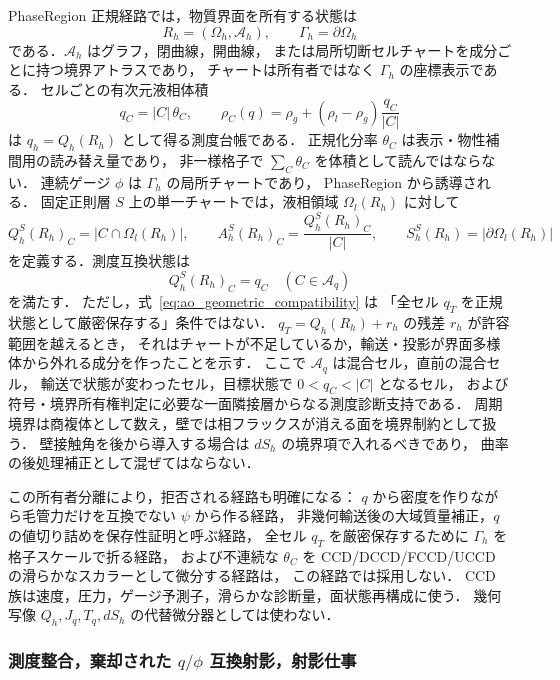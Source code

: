 PhaseRegion 正規経路では，物質界面を所有する状態は
\[
  R_h=(\Omega_h,\mathcal{A}_h),
  \qquad
  \Gamma_h=\partial\Omega_h
\]
である．$\mathcal{A}_h$ はグラフ，閉曲線，開曲線，
または局所切断セルチャートを成分ごとに持つ境界アトラスであり，
チャートは所有者ではなく $\Gamma_h$ の座標表示である．
セルごとの有次元液相体積
\begin{equation}
  q_C = |C|\,\theta_C,\qquad
  \rho_C(q)=\rho_g+(\rho_l-\rho_g)\frac{q_C}{|C|}
  \label{eq:ao_volume_owner}
\end{equation}
は $q_h=Q_h(R_h)$ として得る測度台帳である．
正規化分率 $\theta_C$ は表示・物性補間用の読み替え量であり，
非一様格子で $\sum_C\theta_C$ を体積として読んではならない．
連続ゲージ $\phi$ は $\Gamma_h$ の局所チャートであり，
PhaseRegion から誘導される．
固定正則層 $S$ 上の単一チャートでは，液相領域
$\Omega_l(R_h)$ に対して
\begin{equation}
  Q_h^S(R_h)_C
  =
  |C\cap\Omega_l(R_h)|,
  \qquad
  A_h^S(R_h)_C=\frac{Q_h^S(R_h)_C}{|C|},
  \qquad
  S_h^S(R_h)=|\partial\Omega_l(R_h)|
  \label{eq:ao_geometry_maps}
\end{equation}
を定義する．測度互換状態は
\begin{equation}
  Q_h^S(R_h)_C=q_C
  \quad (C\in\mathcal{A}_q)
  \label{eq:ao_geometric_compatibility}
\end{equation}
を満たす．
ただし，式~\eqref{eq:ao_geometric_compatibility} は
「全セル $q_T$ を正規状態として厳密保存する」条件ではない．
$q_T=Q_h(R_h)+r_h$ の残差 $r_h$ が許容範囲を越えるとき，
それはチャートが不足しているか，輸送・投影が界面多様体から外れる成分を作ったことを示す．
ここで $\mathcal{A}_q$ は混合セル，直前の混合セル，
輸送で状態が変わったセル，目標状態で $0<q_C<|C|$ となるセル，
および符号・境界所有権判定に必要な一面隣接層からなる測度診断支持である．
周期境界は商複体として数え，壁では相フラックスが消える面を境界制約として扱う．
壁接触角を後から導入する場合は $dS_h$ の境界項で入れるべきであり，
曲率の後処理補正として混ぜてはならない．

この所有者分離により，拒否される経路も明確になる：
$q$ から密度を作りながら毛管力だけを互換でない $\psi$ から作る経路，
非幾何輸送後の大域質量補正，$q$ の値切り詰めを保存性証明と呼ぶ経路，
全セル $q_T$ を厳密保存するために $\Gamma_h$ を格子スケールで折る経路，
および不連続な $\theta_C$ を CCD/DCCD/FCCD/UCCD の滑らかなスカラーとして微分する経路は，
この経路では採用しない．
CCD 族は速度，圧力，ゲージ予測子，滑らかな診断量，面状態再構成に使う．
幾何写像 $Q_h,J_q,T_q,dS_h$ の代替微分器としては使わない．

\subsubsection{測度整合，棄却された $q/\phi$ 互換射影，射影仕事}
\label{sec:ao_compatibility_projection}

